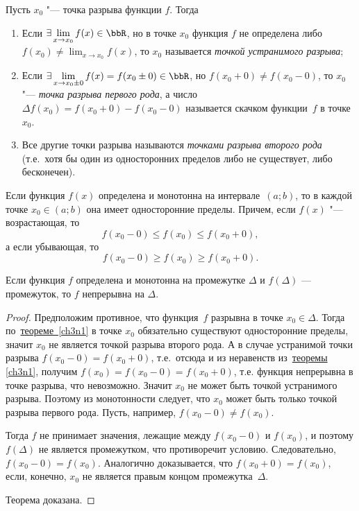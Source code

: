 \begin{defn}
Пусть $x_0$ "--- точка разрыва функции $f$. Тогда 
\begin{enumerate}[wide, labelwidth=!, labelindent=0pt]
\item
Если $\exists \lim_{x \to x_0}\limits f(x) \in \bbR$, но в точке $x_0$ функция $f$ не определена либо $f(x_0)\ne \lim_{x\to x_0}\limits f(x)$, то $x_0$ называется \textit{точкой устранимого разрыва};

\vspace*{\baselineskip}
\item
Если $\exists \lim_{x \to x_0\pm0}\limits f(x)=f(x_0\pm 0) \in \bbR$, но $f(x_0+0)\ne f(x_0-0)$, то $x_0$ "--- \textit{точка разрыва первого рода}, а число $\Delta f(x_0)=f(x_0+0)-f(x_0-0)$ называется скачком функции~$f$ в точке~$x_0$.

\vspace*{\baselineskip}
\item
Все другие точки разрыва называются \textit{точками разрыва второго рода} (т.е.~хотя бы один из односторонних пределов либо не существует, либо бесконечен).
\end{enumerate}
\end{defn}
\begin{thm} \label{ch3n1} 
Если функция $f(x)$ определена и монотонна на интервале~$(a;b)$, то в каждой точке $x_0\in(a;b)$ она имеет односторонние пределы. Причем, если $f(x)$ "--- возрастающая, то 
$$
f(x_0-0)\le f(x_0)\le f(x_0+0),
$$
а если убывающая, то
$$
f(x_0-0)\ge f(x_0)\ge f(x_0+0).
$$
\end{thm}
\begin{thm} \label{ch3n3} 
Если функция $f$ определена и монотонна на промежутке $\Delta$ и $f(\Delta)$ — промежуток, то $f$ непрерывна на $\Delta$.
\end{thm}
\begin{proof}
Предположим противное, что функция~$f$ разрывна в точке $x_0 \in\Delta$. Тогда по~\hyperref[ch3n1]{теореме~\ref{ch3n1}} в точке $x_0$ обязательно существуют односторонние пределы, значит $x_0$ не является точкой разрыва второго рода.  А в случае устранимой точки разрыва $f(x_0-0)=f(x_0+0)$, т.е.~отсюда и из неравенств из~\hyperref[ch3n1]{теоремы \ref{ch3n1}}, получим $f(x_0)=f(x_0-0)=f(x_0+0)$, т.е. функция непрерывна в точке разрыва, что невозможно. Значит $x_0$ не может быть точкой устранимого разрыва. Поэтому из монотонности следует, что $x_0$ может быть только точкой разрыва первого рода. Пусть, например, $f(x_0-0)\ne f(x_0)$.

Тогда $f$ не принимает значения, лежащие между $f(x_0 - 0)$ и $f(x_0)$, и поэтому $f(\Delta)$ не является промежутком, что противоречит условию. Следовательно, $f(x_0-0) = f(x_0)$. Аналогично доказывается, что  $f(x_0 + 0) = f(x_0)$, если, конечно, $x_0$ не является правым концом промежутка~$\Delta$. 

Теорема доказана.
\end{proof} 

